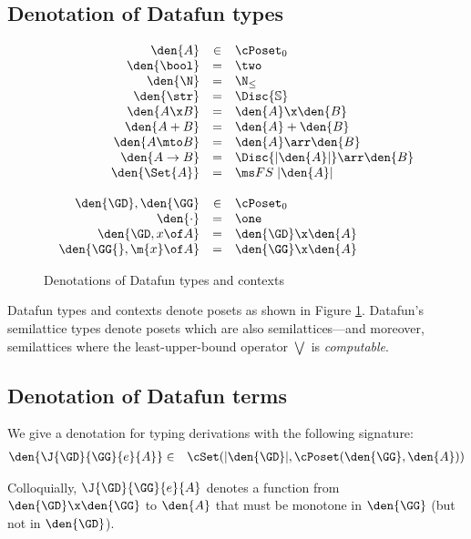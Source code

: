 \subsection{Denotation of Datafun types}
\begin{figure}
  \[\begin{array}{rcl}
  \den{A} &\in& \cPoset_0\\
  \den{\bool} &=& \two\\
  \den{\N} &=& \N_\le\\
  \den{\str} &=& \Disc{\mathbb{S}}\\
  \den{A \x B} &=& \den{A} \x \den{B}\\
  \den{A + B} &=& \den{A} + \den{B}\\
  \den{A \mto B} &=& \den{A} \arr \den{B}\\
  \den{A \uto B} &=& \Disc{\U{\den{A}}} \arr \den{B}\\
  \den{\Set{A}} &=& \FS{\U{\den{A}}}%
  \\\\
  \den{\GD}, \den{\GG} &\in& \cPoset_0\\
  \den{\cdot} &=& \one\\
  \den{\GD, x\of A} &=& \den{\GD} \x \den{A}\\
  \den{\GG{}, \m{x}\of A} &=& \den{\GG} \x \den{A}
  \end{array}\]
  \caption{Denotations of Datafun types and contexts}
  \label{fig:sem-types}
\end{figure}

Datafun types and contexts denote posets as shown in Figure \ref{fig:sem-types}.
Datafun's semilattice types denote posets which are also semilattices---and
moreover, semilattices where the least-upper-bound operator $\bigvee$ is
\emph{computable}. 

\subsection{Denotation of Datafun terms}

We give a denotation for typing derivations with the following signature:
\begin{eqnarray*}
  \den{\J{\GD}{\GG}{e}{A}} &\in&
  \cSet(\U{\den{\GD}}, \cPoset(\den{\GG}, \den{A}))
\end{eqnarray*}

Colloquially, $\J{\GD}{\GG}{e}{A}$ denotes a function from $\den{\GD} \x
\den{\GG}$ to $\den{A}$ that must be monotone in $\den{\GG}$ (but not in
$\den{\GD}$).
